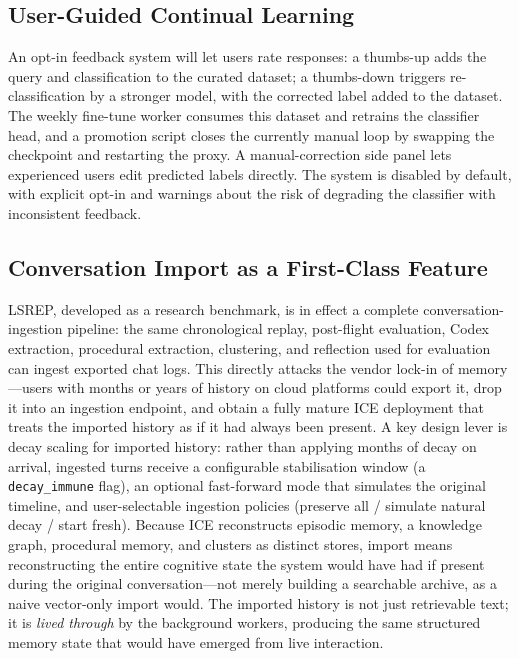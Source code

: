 \documentclass[11pt,a4paper]{article}
\begin{document}
\subsection{User-Guided Continual Learning}
An opt-in feedback system will let users rate responses: a thumbs-up adds the query and classification to the curated dataset; a thumbs-down triggers re-classification by a stronger model, with the corrected label added to the dataset. The weekly fine-tune worker consumes this dataset and retrains the classifier head, and a promotion script closes the currently manual loop by swapping the checkpoint and restarting the proxy. A manual-correction side panel lets experienced users edit predicted labels directly. The system is disabled by default, with explicit opt-in and warnings about the risk of degrading the classifier with inconsistent feedback.

\subsection{Conversation Import as a First-Class Feature}
LSREP, developed as a research benchmark, is in effect a complete conversation-ingestion pipeline: the same chronological replay, post-flight evaluation, Codex extraction, procedural extraction, clustering, and reflection used for evaluation can ingest exported chat logs. This directly attacks the vendor lock-in of memory---users with months or years of history on cloud platforms could export it, drop it into an ingestion endpoint, and obtain a fully mature ICE deployment that treats the imported history as if it had always been present. A key design lever is decay scaling for imported history: rather than applying months of decay on arrival, ingested turns receive a configurable stabilisation window (a \texttt{decay\_immune} flag), an optional fast-forward mode that simulates the original timeline, and user-selectable ingestion policies (preserve all / simulate natural decay / start fresh). Because ICE reconstructs episodic memory, a knowledge graph, procedural memory, and clusters as distinct stores, import means reconstructing the entire cognitive state the system would have had if present during the original conversation---not merely building a searchable archive, as a naive vector-only import would. The imported history is not just retrievable text; it is \emph{lived through} by the background workers, producing the same structured memory state that would have emerged from live interaction.

\end{document}
